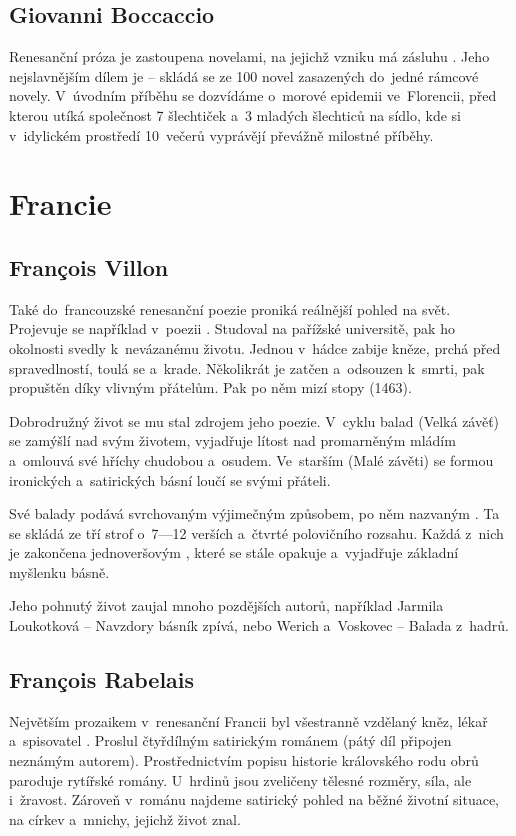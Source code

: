 \subsection*{Giovanni Boccaccio}
Renesanční próza je zastoupena novelami, na jejichž vzniku má zásluhu . Jeho nejslavnějším dílem
je  -- skládá se ze 100 novel zasazených do~jedné rámcové novely. V~úvodním příběhu se dozvídáme o~morové
epidemii ve~Florencii, před kterou utíká společnost 7 šlechtiček a~3 mladých šlechticů na sídlo, kde si v~idylickém prostředí
10~večerů vyprávějí převážně milostné příběhy.


\section{Francie}
\subsection*{Fran\c cois Villon}
Také do~francouzské renesanční poezie proniká reálnější pohled na svět. Projevuje se například v~poezii 
. Studoval na pařížské universitě, pak ho okolnosti svedly k~nevázanému životu. 
Jednou v~hádce zabije kněze, prchá před spravedlností, toulá se a~krade. Několikrát je zatčen a~odsouzen k~smrti,
pak propuštěn díky vlivným přátelům. Pak po něm mizí stopy (1463).

Dobrodružný život se mu stal zdrojem jeho poezie. V~cyklu balad
 (Velká závěť) se zamýšlí  nad svým životem,
vyjadřuje lítost nad promarněným mládím a~omlouvá své hříchy chudobou 
a~osudem. \linebreak[3] Ve~starším  (Malé závěti) se formou
ironických a~satirických básní loučí se svými přáteli.

Své balady podává svrchovaným výjimečným způsobem, po něm nazvaným . Ta se skládá ze tří
strof o~7---12 verších a~čtvrté polovičního rozsahu. Každá z~nich je zakončena jednoveršovým ,
které se stále opakuje a~vyjadřuje základní myšlenku básně.

Jeho pohnutý život zaujal mnoho pozdějších autorů, například Jarmila Loukotková -- Navzdory básník zpívá, nebo
Werich a~Voskovec -- Balada z~hadrů.

\subsection*{Fran\c cois Rabelais}
Největším prozaikem v~renesanční Francii byl všestranně vzdělaný kněz, lékař a~spisovatel .
Proslul čtyřdílným satirickým románem  (pátý díl připojen neznámým autorem).
Prostřednictvím popisu historie královského rodu obrů paroduje rytířské romány. U~hrdinů jsou zveličeny tělesné 
rozměry, síla, ale i~žravost. Zároveň v~románu najdeme satirický pohled na běžné životní situace, na církev a~mnichy, 
jejichž život znal.

